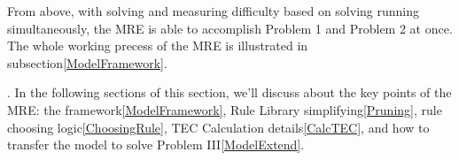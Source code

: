 From above, with solving and measuring difficulty based on solving running simultaneously, the MRE is able to accomplish Problem 1 and Problem 2 at once. The whole working precess of the MRE is illustrated in subsection\ref{ModelFramework}.

. In the following sections of this section, we'll discuss about the key points of the MRE: the framework\ref{ModelFramework}, Rule Library simplifying\ref{Pruning}, rule choosing logic\ref{ChoosingRule}, TEC Calculation details\ref{CalcTEC}, and how to transfer the model to solve Problem III\ref{ModelExtend}.






